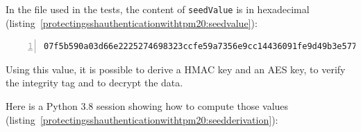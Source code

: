 In the file used in the tests, the content of
\texttt{seedValue} is in hexadecimal
(listing~\ref{protectingsshauthenticationwithtpm20:seedvalue}):

\begin{lstlisting}[numbers=left, caption={\texttt{seedValue} of the SRK used in tests}, label=protectingsshauthenticationwithtpm20:seedvalue]
07f5b590a03d66e2225274698323ccfe59a7356e9cc14436091fe9d49b3e577c
\end{lstlisting}

Using this value, it is possible to derive a HMAC key and an AES key, to
verify the integrity tag and to decrypt the data.

Here is a Python 3.8 session showing how to compute those values
(listing~\ref{protectingsshauthenticationwithtpm20:seedderivation}):

